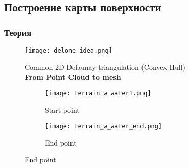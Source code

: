 
\subsection{Построение карты поверхности}


\subsubsection{Теория}


\begin{figure}[H]
    \centering\texttt{[image: delone\_idea.png]}
    \caption*{Common 2D Delaunay triangulation (Convex Hull) \\ \textbf{From Point Cloud to mesh}}
    \label{fig:delone_idea.png}
\end{figure}

\begin{figure}[H]
    \begin{subfigure}[t]{0.49\textwidth}
        \centering\texttt{[image: terrain\_w\_water1.png]}
        \caption*{Start point}
    \end{subfigure}
    \begin{subfigure}[t]{0.49\textwidth}
        \centering\texttt{[image: terrain\_w\_water\_end.png]}
        \caption*{End point}
    \end{subfigure}
\end{figure}

